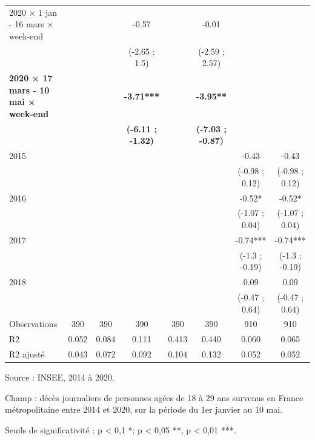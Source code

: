 \documentclass[titlepage]{article}
\begin{document}
\begin{landscape}
\begin{table}[H]
{\begin{threeparttable}
\begin{tabular}[t]{lccccccc}
2020 × 1 jan - 16 mars × week-end &  &  & -0.57 &  & -0.01 &  & \\
 &  &  & (-2.65 ; 1.5) &  & (-2.59 ; 2.57) &  & \\
\textbf{2020 × 17 mars - 10 mai × week-end} & \textbf{} & \textbf{} & \textbf{-3.71***} & \textbf{} & \textbf{-3.95**} & \textbf{} & \textbf{}\\
\textbf{} & \textbf{} & \textbf{} & \textbf{(-6.11 ; -1.32)} & \textbf{} & \textbf{(-7.03 ; -0.87)} & \textbf{} & \textbf{}\\
2015 &  &  &  &  &  & -0.43 & -0.43\\
 &  &  &  &  &  & (-0.98 ; 0.12) & (-0.98 ; 0.12)\\
2016 &  &  &  &  &  & -0.52* & -0.52*\\
 &  &  &  &  &  & (-1.07 ; 0.04) & (-1.07 ; 0.04)\\
2017 &  &  &  &  &  & -0.74*** & -0.74***\\
 &  &  &  &  &  & (-1.3 ; -0.19) & (-1.3 ; -0.19)\\
2018 &  &  &  &  &  & 0.09 & 0.09\\
 &  &  &  &  &  & (-0.47 ; 0.64) & (-0.47 ; 0.64)\\
Observations & 390 & 390 & 390 & 390 & 390 & 910 & 910\\
R2 & 0.052 & 0.084 & 0.111 & 0.413 & 0.440 & 0.060 & 0.065\\
R2 ajusté & 0.043 & 0.072 & 0.092 & 0.104 & 0.132 & 0.052 & 0.052\\
\bottomrule
\end{tabular}
\begin{tablenotes}
\item Source : INSEE, 2014 à 2020.
\item Champ : décès journaliers de personnes agées de 18 à 29 ans survenus en France métropolitaine entre 2014 et 2020, sur la période du 1er janvier au 10 mai.
\item Seuils de significativité : p < 0,1 *; p < 0,05 **, p < 0,01 ***.
\end{tablenotes}
\end{threeparttable}}
\end{table}\end{landscape}
\end{document}
